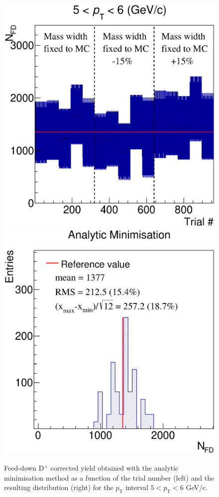 \documentclass[b5paper,10pt,twoside,oldstyle,classica]{toptesi}
\newcommand{\pt}{p_\text{T}}
\begin{document}
\begin{figure}[tb]
\begin{center}
{\includegraphics[scale = 0.3]{CorrYieldsVsTrialFDMin_Pt3.eps}}
\hspace{-0.5cm}
{\includegraphics[scale = 0.3]{CorrYieldsDispFDMin_Pt3.eps}}
\caption{Feed-down D$^+$ corrected yield obtained with the analytic minimisation method as a function of the trial number (left) and the resulting distribution (right) for the $\pt$ interval $5<\pt<6$ GeV/c.}
\label{cutvar_FD_massfits}
\end{center}
\end{figure} 
\end{document}
